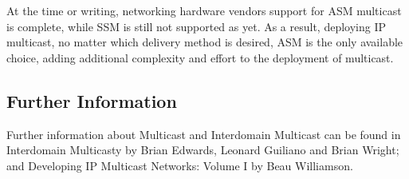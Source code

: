 At the time or writing, networking hardware vendors support for ASM
multicast is complete, while SSM is still not supported as yet. As a
result, deploying IP multicast, no matter which delivery method is
desired, ASM is the only available choice, adding additional complexity
and effort to the deployment of multicast.

\subsection{Further Information}

Further information about Multicast and Interdomain Multicast can be
found in Interdomain Multicasty by Brian Edwards, Leonard Guiliano and
Brian Wright; and Developing IP Multicast Networks: Volume I by Beau
Williamson.
